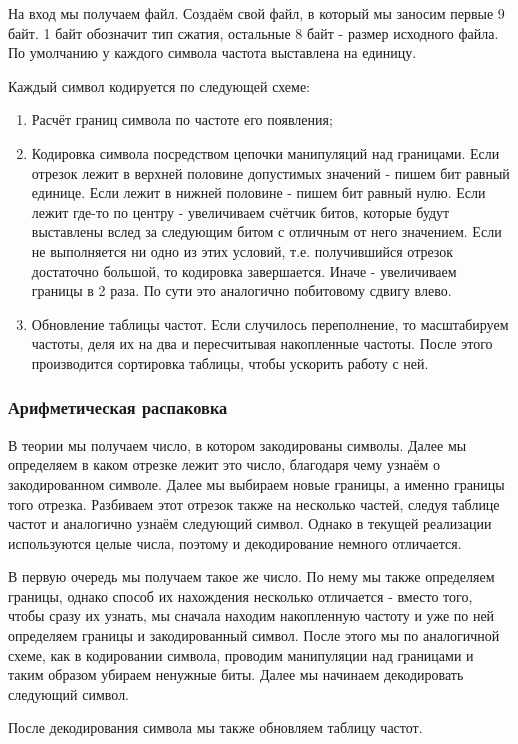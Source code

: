 \documentclass[12pt]{article}
\begin{document}
На вход мы получаем файл. Создаём свой файл, в который мы заносим первые 9 байт. 1 байт обозначит тип сжатия, остальные 8 байт - размер исходного файла. По умолчанию у каждого символа частота выставлена на единицу.

Каждый символ кодируется по следующей схеме:

\begin{enumerate}
    \item Расчёт границ символа по частоте его появления;
    \item Кодировка символа посредством цепочки манипуляций над границами. Если отрезок лежит в верхней половине допустимых значений - пишем бит равный единице. Если лежит в нижней половине - пишем бит равный нулю. Если лежит где-то по центру - увеличиваем счётчик битов, которые будут выставлены вслед за следующим битом с отличным от него значением. Если не выполняется ни одно из этих условий, т.е. получившийся отрезок достаточно большой, то кодировка завершается. Иначе - увеличиваем границы в 2 раза. По сути это аналогично побитовому сдвигу влево.
    \item Обновление таблицы частот. Если случилось переполнение, то масштабируем частоты, деля их на два и пересчитывая накопленные частоты. После этого производится сортировка таблицы, чтобы ускорить работу с ней.
\end{enumerate}
\subsubsection*{Арифметическая распаковка}
В теории мы получаем число, в котором закодированы символы. Далее мы определяем в каком отрезке лежит это число, благодаря чему узнаём о закодированном символе. Далее мы выбираем новые границы, а именно границы того отрезка. Разбиваем этот отрезок также на несколько частей, следуя таблице частот и аналогично узнаём следующий символ. Однако в текущей реализации используются целые числа, поэтому и декодирование немного отличается.

В первую очередь мы получаем такое же число. По нему мы также определяем границы, однако способ их нахождения несколько отличается - вместо того, чтобы сразу их узнать, мы сначала находим накопленную частоту и уже по ней определяем границы и закодированный символ. После этого мы по аналогичной схеме, как в кодировании символа, проводим манипуляции над границами и таким образом убираем ненужные биты. Далее мы начинаем декодировать следующий символ.

После декодирования символа мы также обновляем таблицу частот.
\end{document}
